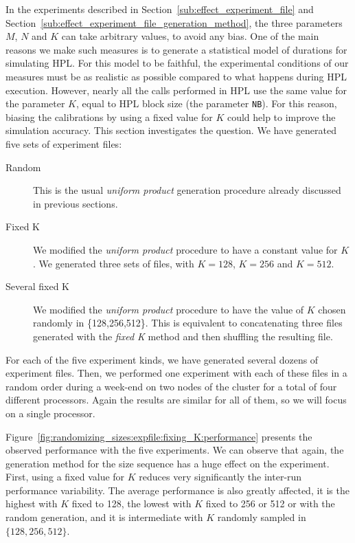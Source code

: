             In the experiments described in Section~\ref{sub:effect_experiment_file} and
            Section~\ref{sub:effect_experiment_file_generation_method}, the three \dgemm parameters \(M\), \(N\) and
            \(K\) can take arbitrary values, to avoid any bias. One of the main reasons we make such measures is to
            generate a statistical model of \dgemm durations for simulating HPL. For this model to be faithful, the
            experimental conditions of our measures must be as realistic as possible compared to what happens during HPL
            execution. However, nearly all the \dgemm calls performed in HPL use the same value for the parameter \(K\),
            equal to HPL block size (\ie the parameter \texttt{NB}). For this reason, biasing the calibrations by using
            a fixed value for \(K\) could help to improve the simulation accuracy. This section investigates the
            question. We have generated five sets of experiment files:
            \begin{description}
                \item[Random] This is the usual \emph{uniform product} generation procedure already discussed in
                    previous sections.
                \item[Fixed K] We modified the \emph{uniform product} procedure to have a constant value for \(K\). We
                    generated three sets of files, with \(K=128\), \(K=256\) and \(K=512\).
                \item[Several fixed K] We modified the \emph{uniform product} procedure to have the value of \(K\)
                    chosen randomly in \{128,256,512\}. This is equivalent to concatenating three files generated with
                    the \emph{fixed K} method and then shuffling the resulting file.
            \end{description}
            For each of the five experiment kinds, we have generated several dozens of experiment files. Then, we
            performed one experiment with each of these files in a random order during a week-end on two nodes of the
            \dahu cluster for a total of four different processors. Again the results are similar for all of them, so we
            will focus on a single processor.

            Figure~\ref{fig:randomizing_sizes:expfile:fixing_K:performance} presents the observed \dgemm performance
            with the five experiments. We can observe that again, the generation method for the size sequence has a huge
            effect on the experiment. First, using a fixed value for \(K\) reduces very significantly the inter-run
            performance variability. The average performance is also greatly affected, it is the highest with \(K\)
            fixed to 128, the lowest with \(K\) fixed to 256 or 512 or with the random generation, and it is
            intermediate with \(K\) randomly sampled in \(\{128,256,512\}\).

